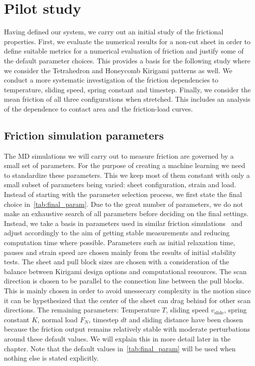 
\chapter{Pilot study}\label{chap:pilot_study}

Having defined our system, we carry out an initial study of the frictional properties. First, we evaluate the numerical results for a non-cut sheet in order to define suitable metrics for a numerical evaluation of friction and justify some of the default parameter choices. This provides a basis for the following study where we consider the Tetrahedron and Honeycomb Kirigami patterns as well. We conduct a more systematic investigation of the friction dependencies to temperature, sliding speed, spring constant and timestep. Finally, we consider the mean friction of all three configurations when stretched. This includes an analysis of the dependence to contact area and the friction-load curves. 


\section{Friction simulation parameters}
The \acrshort{MD} simulations we will carry out to measure friction are governed
by a small set of parameters. For the purpose of creating a machine learning we
need to standardize these parameters. This we keep most of them constant with
only a small subset of parameters being varied: sheet configuration, strain and
load. Instead of starting with the parameter selection process, we first state
the final choice in~\cref{tab:final_param}. Due to the great number of
parameters, we do not make an exhaustive search of all parameters before
deciding on the final settings. Instead, we take a basis in parameters used in
similar friction simulations~\cite{li_evolving_2016, Yoon2015MolecularDS,
liu_high-speed_2014, zhu_study_2018, ma12091425} and adjust accordingly to the
aim of getting stable measurements and reducing computation time where possible.
Parameters such as initial relaxation time, pauses and strain speed are chosen
mainly from the results of initial stability tests. The sheet and pull block
sizes are chosen with a consideration of the balance between Kirigami design
options and computational resources. The scan direction is chosen to be parallel
to the connection line between the pull blocks. This is mainly chosen in order
to avoid unessecary complexity in the motion since it can be hypethesized that the
center of the sheet can drag behind for other scan directions. The remaining
parameters: Temperature $T$, sliding speed $v_{\text{slide}}$, spring constant
$K$, normal load $F_N$, timestep $dt$ and sliding distance have been chosen
because the friction output remains relatively stable with moderate
perturbations around these default values. We will explain this in more detail
later in the chapter. Note that the default values in~\cref{tab:final_param}
will be used when nothing else is stated explicitly.


